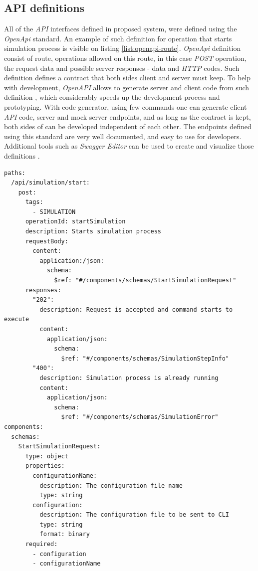 \subsection{API definitions}
All of the \textit{API} interfaces defined in proposed system, were defined using the \textit{OpenApi} standard. An example of such definition for operation that starts simulation process is visible on listing \ref{list:openapi-route}. \textit{OpenApi} definition consist of route, operations allowed on this route, in this case \textit{POST} operation, the request data and possible server responses - data and \textit{HTTP} codes. Such definition defines a contract that both sides client and server must keep. To help with development, \textit{OpenAPI} allows to generate server and client code from such definition \cite{SwaggerCodegen}, which considerably speeds up the development process and prototyping. With code generator, using few commands one can generate client \textit{API} code, server and mock server endpoints, and as long as the contract is kept, both sides of can be developed independent of each other. The endpoints defined using this standard are very well documented, and easy to use for developers. Additional tools such as \textit{Swagger Editor} can be used to create and visualize those definitions \cite{SwaggerEditor}. 
\begin{lstlisting}[label=list:openapi-route,caption=The \textit{OpenAPI} route definition for simulation start request, basicstyle=\footnotesize\ttfamily]
paths:
  /api/simulation/start:
    post:
      tags:
        - SIMULATION
      operationId: startSimulation
      description: Starts simulation process
      requestBody:
        content:
          application:/json:
            schema:
              $ref: "#/components/schemas/StartSimulationRequest"
      responses:
        "202":
          description: Request is accepted and command starts to execute
          content:
            application/json:
              schema:
                $ref: "#/components/schemas/SimulationStepInfo"
        "400":
          description: Simulation process is already running
          content:
            application/json:
              schema:
                $ref: "#/components/schemas/SimulationError"
components:
  schemas:
    StartSimulationRequest:
      type: object
      properties:
        configurationName:
          description: The configuration file name
          type: string
        configuration:
          description: The configuration file to be sent to CLI
          type: string
          format: binary
      required:
        - configuration
        - configurationName
\end{lstlisting}

